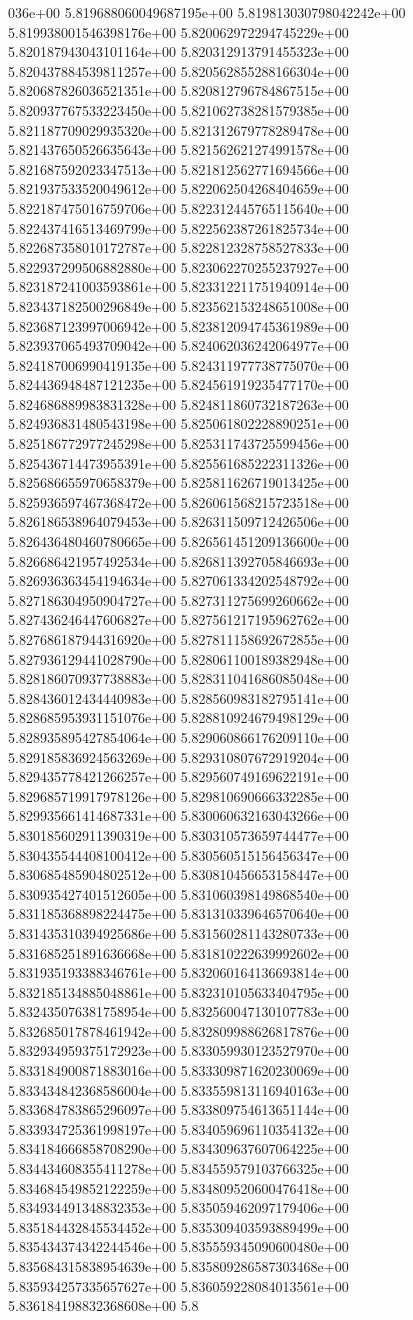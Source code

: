 036e+00	5.819688060049687195e+00	5.819813030798042242e+00	5.819938001546398176e+00	5.820062972294745229e+00	5.820187943043101164e+00	5.820312913791455323e+00	5.820437884539811257e+00	5.820562855288166304e+00	5.820687826036521351e+00	5.820812796784867515e+00	5.820937767533223450e+00	5.821062738281579385e+00	5.821187709029935320e+00	5.821312679778289478e+00	5.821437650526635643e+00	5.821562621274991578e+00	5.821687592023347513e+00	5.821812562771694566e+00	5.821937533520049612e+00	5.822062504268404659e+00	5.822187475016759706e+00	5.822312445765115640e+00	5.822437416513469799e+00	5.822562387261825734e+00	5.822687358010172787e+00	5.822812328758527833e+00	5.822937299506882880e+00	5.823062270255237927e+00	5.823187241003593861e+00	5.823312211751940914e+00	5.823437182500296849e+00	5.823562153248651008e+00	5.823687123997006942e+00	5.823812094745361989e+00	5.823937065493709042e+00	5.824062036242064977e+00	5.824187006990419135e+00	5.824311977738775070e+00	5.824436948487121235e+00	5.824561919235477170e+00	5.824686889983831328e+00	5.824811860732187263e+00	5.824936831480543198e+00	5.825061802228890251e+00	5.825186772977245298e+00	5.825311743725599456e+00	5.825436714473955391e+00	5.825561685222311326e+00	5.825686655970658379e+00	5.825811626719013425e+00	5.825936597467368472e+00	5.826061568215723518e+00	5.826186538964079453e+00	5.826311509712426506e+00	5.826436480460780665e+00	5.826561451209136600e+00	5.826686421957492534e+00	5.826811392705846693e+00	5.826936363454194634e+00	5.827061334202548792e+00	5.827186304950904727e+00	5.827311275699260662e+00	5.827436246447606827e+00	5.827561217195962762e+00	5.827686187944316920e+00	5.827811158692672855e+00	5.827936129441028790e+00	5.828061100189382948e+00	5.828186070937738883e+00	5.828311041686085048e+00	5.828436012434440983e+00	5.828560983182795141e+00	5.828685953931151076e+00	5.828810924679498129e+00	5.828935895427854064e+00	5.829060866176209110e+00	5.829185836924563269e+00	5.829310807672919204e+00	5.829435778421266257e+00	5.829560749169622191e+00	5.829685719917978126e+00	5.829810690666332285e+00	5.829935661414687331e+00	5.830060632163043266e+00	5.830185602911390319e+00	5.830310573659744477e+00	5.830435544408100412e+00	5.830560515156456347e+00	5.830685485904802512e+00	5.830810456653158447e+00	5.830935427401512605e+00	5.831060398149868540e+00	5.831185368898224475e+00	5.831310339646570640e+00	5.831435310394925686e+00	5.831560281143280733e+00	5.831685251891636668e+00	5.831810222639992602e+00	5.831935193388346761e+00	5.832060164136693814e+00	5.832185134885048861e+00	5.832310105633404795e+00	5.832435076381758954e+00	5.832560047130107783e+00	5.832685017878461942e+00	5.832809988626817876e+00	5.832934959375172923e+00	5.833059930123527970e+00	5.833184900871883016e+00	5.833309871620230069e+00	5.833434842368586004e+00	5.833559813116940163e+00	5.833684783865296097e+00	5.833809754613651144e+00	5.833934725361998197e+00	5.834059696110354132e+00	5.834184666858708290e+00	5.834309637607064225e+00	5.834434608355411278e+00	5.834559579103766325e+00	5.834684549852122259e+00	5.834809520600476418e+00	5.834934491348832353e+00	5.835059462097179406e+00	5.835184432845534452e+00	5.835309403593889499e+00	5.835434374342244546e+00	5.835559345090600480e+00	5.835684315838954639e+00	5.835809286587303468e+00	5.835934257335657627e+00	5.836059228084013561e+00	5.836184198832368608e+00	5.8
